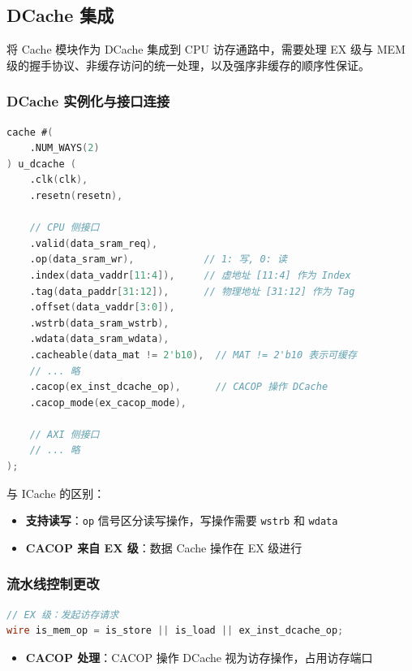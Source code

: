 \subsection{DCache 集成}

将 Cache 模块作为 DCache 集成到 CPU 访存通路中，需要处理 EX 级与 MEM 级的握手协议、非缓存访问的统一处理，以及强序非缓存的顺序性保证。

\subsubsection{DCache 实例化与接口连接}

\begin{lstlisting}[language=Verilog, caption=DCache 实例化]
cache #(
    .NUM_WAYS(2)
) u_dcache (
    .clk(clk),
    .resetn(resetn),
    
    // CPU 侧接口
    .valid(data_sram_req),
    .op(data_sram_wr),            // 1: 写, 0: 读
    .index(data_vaddr[11:4]),     // 虚地址 [11:4] 作为 Index
    .tag(data_paddr[31:12]),      // 物理地址 [31:12] 作为 Tag
    .offset(data_vaddr[3:0]),
    .wstrb(data_sram_wstrb),
    .wdata(data_sram_wdata),
    .cacheable(data_mat != 2'b10),  // MAT != 2'b10 表示可缓存
    // ... 略
    .cacop(ex_inst_dcache_op),      // CACOP 操作 DCache
    .cacop_mode(ex_cacop_mode),
    
    // AXI 侧接口
    // ... 略
);
\end{lstlisting}

与 ICache 的区别：
\begin{itemize}
    \item \textbf{支持读写}：\verb|op| 信号区分读写操作，写操作需要 \verb|wstrb| 和 \verb|wdata|
    \item \textbf{CACOP 来自 EX 级}：数据 Cache 操作在 EX 级进行
\end{itemize}

\subsubsection{流水线控制更改}

\begin{lstlisting}[language=Verilog, caption=EX 和 MEM 级控制逻辑]
// EX 级：发起访存请求
wire is_mem_op = is_store || is_load || ex_inst_dcache_op;
\end{lstlisting}

\begin{itemize}
    \item \textbf{CACOP 处理}：CACOP 操作 DCache 视为访存操作，占用访存端口
\end{itemize}

